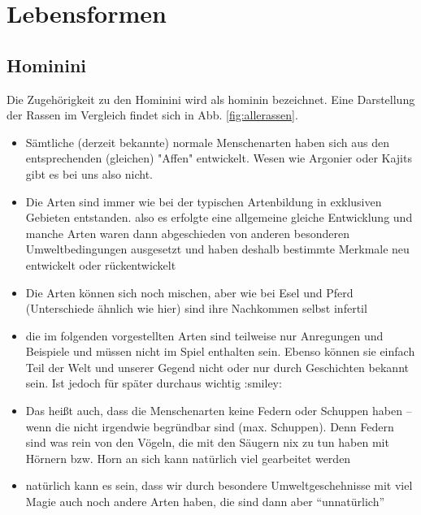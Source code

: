 \chapter{Lebensformen}
\section{Hominini}
Die Zugehörigkeit zu den Hominini wird als hominin bezeichnet. Eine Darstellung der Rassen im Vergleich findet sich in Abb. \ref{fig:allerassen}.
\begin{itemize}
	\item Sämtliche (derzeit bekannte) normale Menschenarten haben sich aus den entsprechenden (gleichen) "Affen" entwickelt. Wesen wie Argonier oder Kajits gibt es bei uns also nicht.
	\item Die Arten sind immer wie bei der typischen Artenbildung in exklusiven Gebieten entstanden. also es erfolgte eine allgemeine gleiche Entwicklung und manche Arten waren dann abgeschieden von anderen besonderen Umweltbedingungen ausgesetzt und haben deshalb bestimmte Merkmale neu entwickelt oder rückentwickelt
	\item Die Arten können sich noch mischen, aber wie bei Esel und Pferd (Unterschiede ähnlich wie hier) sind ihre Nachkommen selbst infertil
	\item die im folgenden vorgestellten Arten sind teilweise nur Anregungen und Beispiele und müssen nicht im Spiel enthalten sein. Ebenso können sie einfach Teil der Welt und unserer Gegend nicht oder nur durch Geschichten bekannt sein. Ist jedoch für später durchaus wichtig :smiley:
	\item Das heißt auch, dass die Menschenarten keine Federn oder Schuppen haben -- wenn die nicht irgendwie begründbar sind (max. Schuppen). Denn Federn sind was rein von den Vögeln, die mit den Säugern nix zu tun haben
	mit Hörnern bzw. Horn an sich kann natürlich viel gearbeitet werden
	\item natürlich kann es sein, dass wir durch besondere Umweltgeschehnisse mit viel Magie auch noch andere Arten haben, die sind dann aber "`unnatürlich"'
\end{itemize}

